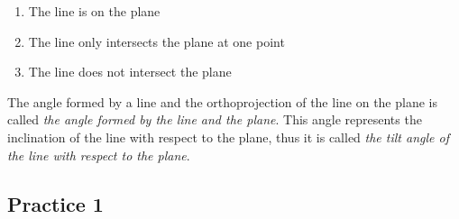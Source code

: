 \documentclass{report}
\begin{document}
\begin{multicols}{2}
    \begin{enumerate}
        \item The line is on the plane
              \begin{center}
              \end{center}
        \item The line only intersects the plane at one point
              \begin{center}
              \end{center}
        \item The line does not intersect the plane
              \begin{center}
              \end{center}
    \end{enumerate}

    The angle formed by a line and the orthoprojection of the line on the plane is
    called \emph{the angle formed by the line and the plane}. This angle represents
    the inclination of the line with respect to the plane, thus it is called
    \emph{the tilt angle of the line with respect to the plane}.

    \subsection{Practice 1}


\end{multicols}
\end{document}
